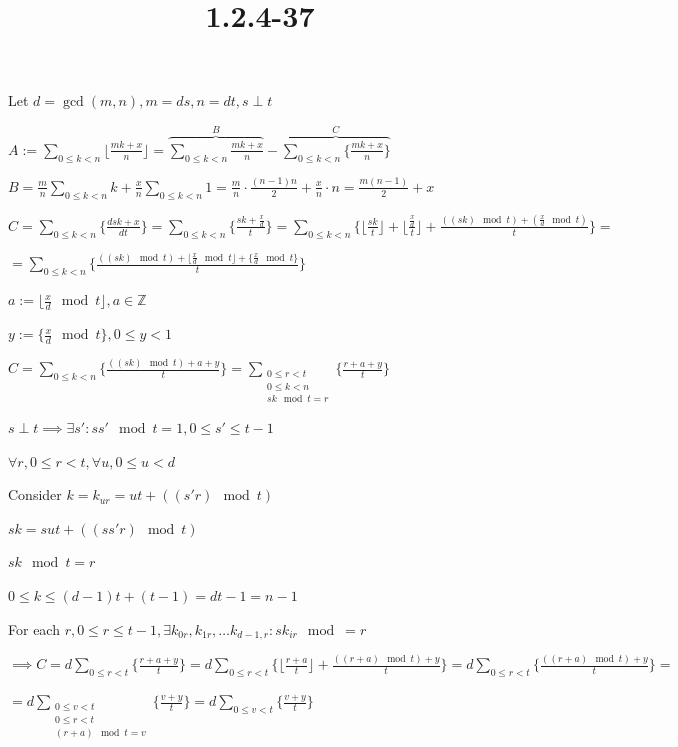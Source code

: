 \documentclass{article}
\title{1.2.4-37}
\begin{document}
\maketitle

Let \( d = \gcd(m,n), m = ds, n = dt, s \perp t \)

\( A := \sum_{0 \leq k < n} \lfloor \frac{mk+x}{n} \rfloor = \overbrace{\sum_{0 \leq k < n} \frac{mk+x}{n}}^B - \overbrace{\sum_{0 \leq k < n} \{ \frac{mk+x}{n} \}}^C \)

\( B = \frac{m}{n} \sum_{0\leq k < n} k + \frac{x}{n} \sum_{0\leq k < n} 1 = \frac{m}{n}\cdot \frac{(n-1)n}{2} + \frac{x}{n}\cdot n = \frac{m(n-1)}{2} + x \)

\( C = \sum_{0\leq k < n} \{ \frac{dsk+x}{dt} \} = \sum_{0\leq k < n} \{ \frac{sk+\frac{x}{d}}{t} \} = \sum_{0\leq k < n} \{ \lfloor \frac{sk}{t} \rfloor + \lfloor \frac{\frac{x}{d}}{t} \rfloor + \frac{((sk) \mod t) + (\frac{x}{d} \mod t)}{t} \} = \)

\( = \sum_{0\leq k < n} \{ \frac{((sk) \mod t) + \lfloor \frac{x}{d} \mod t \rfloor + \{ \frac{x}{d} \mod t \} }{t} \} \)

\( a := \lfloor \frac{x}{d} \mod t \rfloor, a \in \mathbb{Z} \)

\( y := \{ \frac{x}{d} \mod t \}, 0 \leq y < 1 \)

\( C = \sum_{0\leq k < n} \{ \frac{((sk) \mod t) + a + y }{t} \} = \sum_{\substack{0\leq r < t\\0 \leq k < n \\ sk \mod t = r}} \{ \frac{r + a + y }{t} \} \)

\( s \perp t \implies \exists s': ss' \mod t = 1, 0 \leq s' \leq t - 1 \)

\( \forall r, 0 \leq r < t, \forall u, 0 \leq u < d \)

Consider \( k = k_{ur} = ut + ((s'r) \mod t) \)

\( sk = sut + ((ss'r) \mod t) \)

\( sk \mod t = r \)

\( 0 \leq k \leq (d-1)t + (t-1) = dt - 1 = n - 1 \)

For each \( r, 0 \leq r \leq t - 1, \exists k_{0r}, k_{1r}, \ldots k_{d-1,r}: sk_{ir} \mod = r \)

\( \implies C = d\sum_{0 \leq r < t} \{ \frac{r + a + y }{t} \} = d\sum_{0 \leq r < t} \{ \lfloor \frac{r+a}{t} \rfloor + \frac{((r + a) \mod t)  + y }{t} \} = d\sum_{0 \leq r < t} \{ \frac{((r + a) \mod t)  + y }{t} \} = \)

\( = d\sum_{\substack{0 \leq v < t \\ 0 \leq r < t \\ (r + a) \mod t = v}} \{ \frac{v + y}{t} \} = d\sum_{0 \leq v < t} \{ \frac{v + y}{t} \} \)
\end{document}
